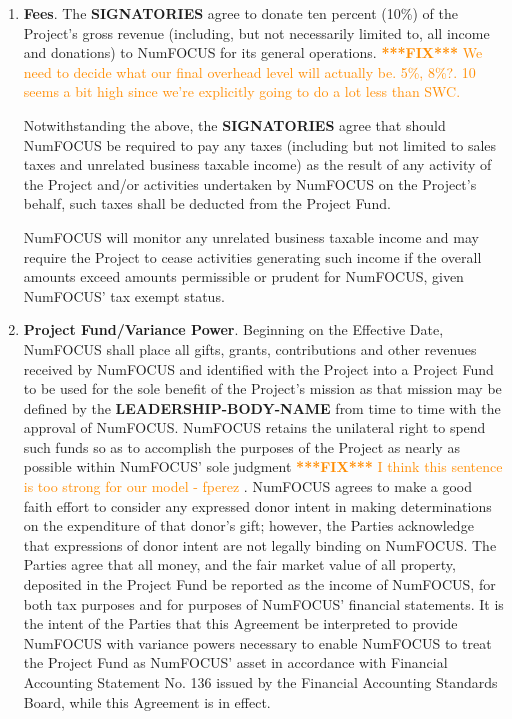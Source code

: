 \documentclass[english,letterpaper,12pt]{article}
\newcommand{\fix}[1]{
  \textcolor{darkorange} { \textbf{***FIX***} #1 } }
\newcommand{\signatories}{\textbf{SIGNATORIES}}
\newcommand{\leadershipbody}{\textbf{LEADERSHIP-BODY-NAME}}
\begin{document}
\begin{enumerate}[label=\arabic*.,ref=\S~\arabic*]
\begin{enumerate}[label=\alph*.,ref=\theenumi(\alph*)]
\item \textbf{Project Not An Agent Of NumFOCUS}. The \signatories{} hereby
  acknowledge that the Project and the \leadershipbody{} do not and shall not
  act as an agent for NumFOCUS unless specifically authorized in writing by
  NumFOCUS to do so.

\end{enumerate}

\item \textbf{Fees}. The \signatories{} agree to donate ten percent (10\%) of
  the Project's gross revenue (including, but not necessarily limited to, all
  income and donations) to NumFOCUS for its general operations. \fix{We need to
    decide what our final overhead level will actually be. 5\%, 8\%?. 10 seems
    a bit high since we're explicitly going to do a lot less than SWC.}


Notwithstanding the above, the \signatories{} agree that should NumFOCUS
be required to pay any taxes (including but not limited to sales taxes
and unrelated business taxable income) as the result of any activity
of the Project and/or activities undertaken by NumFOCUS on the
Project's behalf, such taxes shall be deducted from the Project Fund.


NumFOCUS will monitor any unrelated business taxable income and
may require the Project to cease activities generating such income
if the overall amounts exceed amounts permissible or prudent for NumFOCUS,
given NumFOCUS' tax exempt status.

\item \textbf{Project Fund/Variance Power}. Beginning on the Effective Date,
  NumFOCUS shall place all gifts, grants, contributions and other revenues
  received by NumFOCUS and identified with the Project into a Project Fund to
  be used for the sole benefit of the Project's mission as that mission may be
  defined by the \leadershipbody{} from time to time with the approval of
  NumFOCUS. NumFOCUS retains the unilateral right to spend such funds so as to
  accomplish the purposes of the Project as nearly as possible within NumFOCUS'
  sole judgment \fix{I think this sentence is too strong for our model -
    fperez}.  NumFOCUS agrees to make a good faith effort to consider any
  expressed donor intent in making determinations on the expenditure of that
  donor's gift; however, the Parties acknowledge that expressions of donor
  intent are not legally binding on NumFOCUS. The Parties agree that all money,
  and the fair market value of all property, deposited in the Project Fund be
  reported as the income of NumFOCUS, for both tax purposes and for purposes of
  NumFOCUS' financial statements. It is the intent of the Parties that this
  Agreement be interpreted to provide NumFOCUS with variance powers necessary
  to enable NumFOCUS to treat the Project Fund as NumFOCUS' asset in accordance
  with Financial Accounting Statement No. 136 issued by the Financial
  Accounting Standards Board, while this Agreement is in effect.
  

\end{enumerate}
\end{document}
